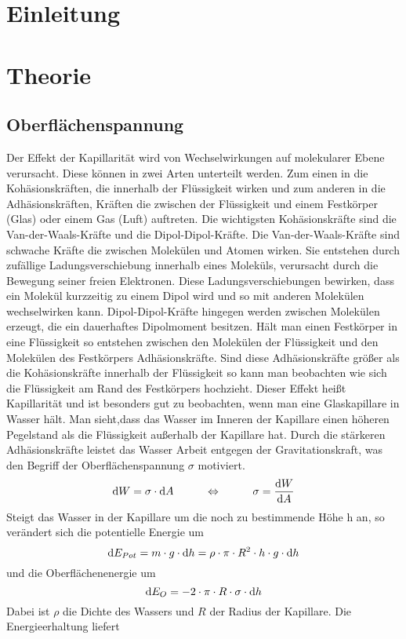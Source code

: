 \documentclass[12pt, a4paper, twoside]{scrartcl}
\begin{document}

\cleardoublepage
\tableofcontents
\cleardoublepage
\setcounter{page}{1}

\section{Einleitung}
\label{sec:einleitung}

\section{Theorie}
\label{sec:theorie}

\subsection{Oberflächenspannung}
Der Effekt der Kapillarität wird von Wechselwirkungen auf molekularer Ebene verursacht. Diese können in zwei Arten unterteilt werden. Zum einen in die Kohäsionskräften, die innerhalb der Flüssigkeit wirken und zum anderen in die Adhäsionskräften, Kräften die zwischen der Flüssigkeit und einem Festkörper (Glas) oder einem Gas (Luft) auftreten.\newline
\newline
Die wichtigsten Kohäsionskräfte sind die Van-der-Waals-Kräfte und die Dipol-Dipol-Kräfte. Die Van-der-Waals-Kräfte sind schwache Kräfte die zwischen Molekülen und Atomen wirken. Sie entstehen durch zufällige Ladungsverschiebung innerhalb eines Moleküls, verursacht durch die Bewegung seiner freien Elektronen. Diese Ladungsverschiebungen bewirken, dass ein Molekül kurzzeitig zu einem Dipol wird und so mit anderen Molekülen wechselwirken kann. 
Dipol-Dipol-Kräfte hingegen werden zwischen Molekülen erzeugt, die ein dauerhaftes Dipolmoment besitzen.\newline
\newline
Hält man einen Festkörper in eine Flüssigkeit so entstehen zwischen den Molekülen der Flüssigkeit und den Molekülen des Festkörpers Adhäsionskräfte. Sind diese Adhäsionskräfte größer als die Kohäsionskräfte innerhalb der Flüssigkeit so kann man beobachten wie sich die Flüssigkeit am Rand des Festkörpers hochzieht. Dieser Effekt heißt Kapillarität und ist besonders gut zu beobachten, wenn man eine Glaskapillare in Wasser hält. Man sieht,dass das Wasser im Inneren der Kapillare einen höheren Pegelstand als die Flüssigkeit außerhalb der Kapillare hat. Durch die stärkeren Adhäsionskräfte leistet das Wasser Arbeit entgegen der Gravitationskraft, was den Begriff der Oberflächenspannung $\sigma$ motiviert. \[\textup dW=\sigma\cdot\textup dA\hspace{1cm}\Leftrightarrow\hspace{1cm}\sigma=\frac{\textup dW}{\textup dA}\] Steigt das Wasser in der Kapillare um die noch zu bestimmende Höhe h an, so verändert sich die potentielle Energie um \[\textup dE_{Pot}=m\cdot g\cdot\textup dh=\rho\cdot\pi\cdot R^2\cdot h\cdot g\cdot\textup dh\] und die Oberflächenenergie um \[\textup dE_{O}=-2\cdot\pi\cdot R\cdot\sigma\cdot\textup dh\]Dabei ist $\rho$ die Dichte des Wassers und $R$ der Radius der Kapillare. Die Energieerhaltung liefert 
\end{document}
